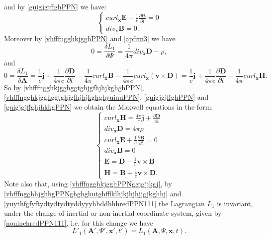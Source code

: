 \documentclass{article}
\theoremstyle{definition}
\theoremstyle{remark}
\renewcommand{\vec}[1]{\mathbf{#1}}
\newcommand{\er}{\eqref}
\newcommand{\er}{\eqref}
\begin{document}
and by \er{guigjgjffghPPN} we have:
\begin{equation}\label{guigjgjffghjhkkgPPN}
\begin{cases}
curl_{\vec x}\vec E+\frac{1}{c}\frac{\partial\vec B}{\partial t}=0\\
div_{\vec x}\vec B=0.
\end{cases}
\end{equation}
Moreover by \er{vhfffngghkjgghPPN} and \er{apfrm3} we have
\begin{equation}\label{vhfffngghkjgghggtghjgfhjhjkghghPPN}
0=\frac{\delta L_1}{\delta \Psi}=\frac{1}{4\pi}div_{\vec x}\vec
D-\rho,
\end{equation}
and
\begin{equation}\label{vhfffngghkjgghggtghjgfhjhjkghghyuiuuPPN}
0=\frac{\delta L_1}{\delta \vec A}=\frac{1}{c}\vec j+\frac{1}{4\pi
c}\frac{\partial\vec D}{\partial t}-\frac{1}{4\pi}curl_{\vec x}\vec
B-\frac{1}{4\pi c}curl_{\vec x}\left(\vec v\times \vec
D\right)=\frac{1}{c}\vec j+\frac{1}{4\pi c}\frac{\partial\vec
D}{\partial t}-\frac{1}{4\pi}curl_{\vec x}\vec H.
\end{equation}
So by \er{vhfffngghkjgghggtghjgfhjhjkghghPPN},
\er{vhfffngghkjgghggtghjgfhjhjkghghyuiuuPPN}, \er{guigjgjffghPPN}
and \er{guigjgjffghjhkkgPPN} we obtain the Maxwell equations in the
form:
\begin{equation}\label{guigjgjffghguygjyfPPN}
\begin{cases}
curl_{\vec x}\vec H=\frac{4\pi}{c}\vec j+\frac{\partial\vec
D}{\partial
t}\\
div_{\vec x}\vec D=4\pi\rho\\
curl_{\vec x}\vec E+\frac{1}{c}\frac{\partial\vec B}{\partial t}=0\\
div_{\vec x}\vec B=0\\
\vec E=\vec D-\frac{1}{c}\vec v\times\vec B\\
\vec H=\vec B+\frac{1}{c}\vec v\times\vec D.
\end{cases}
\end{equation}
Note also that, using \er{vhfffngghkjgghPPNggjgjjkgj}, by
\er{vhfffngghhjghhgPPNghghghutghfflklhjkjhjhjjgjkghhj} and
\er{yuythfgfyftydtydtydtyddyyyhhddhhhredPPN111} the Lagrangian $L_1$
is invariant, under the change of inertial or non-inertial
coordinate system, given by \er{noninchredPPN111}, i.e. for this
change we have
\begin{equation}\label{vhfffngghkjgghPPNggjgjjkgjjhhjkghg}
L'_1\left(\vec A',\Psi',\vec x',t'\right)=L_1\left(\vec A,\Psi,\vec
x,t\right).
\end{equation}
\end{document}
